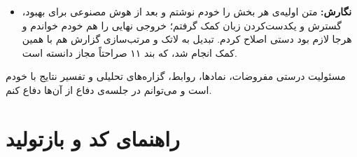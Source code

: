 \documentclass[12pt,a4paper]{article}
\begin{document}
\begin{itemize}[leftmargin=1.4em,itemsep=3pt]
\begin{itemize}[leftmargin=1.2em,itemsep=1pt]
                را نوشتیم تا رفتار را به تفکیک (چک‌پوینت، صندلی، حریف)
                ببینیم $\to$ دیدم عامل ۷۰\% مواقع در مرحله‌ی $\sim2$ خودش
                خارج می‌شود در حالی که  داشت اول می‌رفت. حدس
                زدم چون شاهد کم است  شبیه  دیده
                می‌شود $\to$ ویژگی شمارش شاهد را اضافه کردیم $\to$
                \emph{جواب نداد}، و در گزارش به‌عنوان فرضیه‌ی رد شده
                ثبتش کردم.
          \item «آیا $61.7$ مهارت است یا شانس؟» $\to$ هشت بذر دیگر از
                همان دستور زدیم $\to$ هیچ‌کدام نرسید، و توزیع نشان داد
                $1.5\sigma$ بالای میانگین است (یافته‌ی کلیدی ۱۳). این
                همان جایی بود که تصمیم گرفتم جست‌وجو را متوقف کنم.
          \item وقتی استاد پوشه‌ی  را منتشر کرد: «مطمئن
                شویم چیزی که ما داشتیم همان است» $\to$
                 $\to$ اول  گفت کاملاً
                متفاوت‌اند و یک لحظه نگران شدم؛ بعد دیدم فقط
                / است و پس از یکسان‌سازی بایت‌به‌بایت
                یکی‌اند.
        \end{itemize}
  \item \textbf{نگارش:} متن اولیه‌ی هر بخش را خودم نوشتم و بعد از هوش
        مصنوعی برای بهبود، گسترش و یکدست‌کردن زبان کمک گرفتم؛ خروجی نهایی
        را هم خودم خواندم و هرجا لازم بود دستی اصلاح کردم. تبدیل به لاتک و
        مرتب‌سازی گزارش هم با همین کمک انجام شد، که بند ۱۱ صراحتاً مجاز
        دانسته است.
\end{itemize}

مسئولیت درستی مفروضات، نمادها، روابط، گزاره‌های تحلیلی و تفسیر نتایج با
خودم است و می‌توانم در جلسه‌ی دفاع از آن‌ها دفاع کنم.

\appendix
\section{راهنمای کد و بازتولید}
\end{document}
